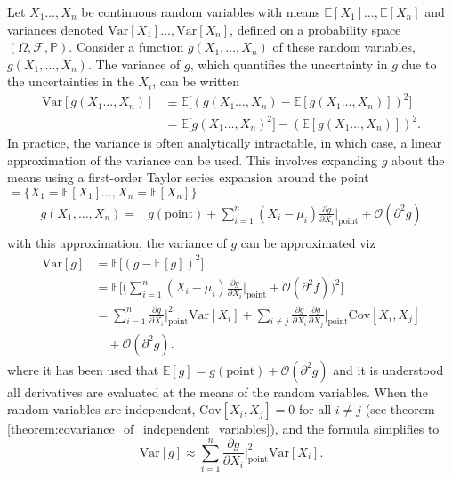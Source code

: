 \begin{definition}
	\label{def:error_propagation}
	Let $X_1 \ldots, X_n$ be continuous random variables with means $\mathbb{E}[X_1] \ldots, \mathbb{E}[X_n]$ and variances denoted $\text{Var}[X_1] \ldots, \text{Var}[X_n]$, defined on a probability space $(\Omega, \mathcal{F},\mathbb{P})$. Consider a function $g(X_1, \ldots, X_n)$ of these random variables, $g(X_1, \ldots, X_n)$. The variance of $g$, which quantifies the uncertainty in $g$ due to the uncertainties in the $X_i$, can be written
	\begin{equation}
		\begin{split}
			\text{Var}[g(X_1 \ldots, X_n)] &\equiv \mathbb{E}\big[(g(X_1 \ldots, X_n) - \mathbb{E}[g(X_1 \ldots, X_n)])^2\big] \\
			&= \mathbb{E}\big[g(X_1\ldots, X_n)^2\big] - (\mathbb{E}[g(X_1 \ldots, X_n)])^2.
		\end{split}
	\end{equation}
	In practice, the variance is often analytically intractable, in which case, a linear approximation of the variance can be used. This involves expanding $g$ about the means using a first-order Taylor series expansion around the point $=\{X_1 = \mathbb{E}[X_1] \ldots, X_n = \mathbb{E}[X_n]\}$
	\begin{equation}
		\begin{split}
			g(X_1, \ldots, X_n) =& g(\text{point}) + \sum_{i=1}^n (X_i - \mu_i) \frac{\partial g}{\partial X_i} \bigg|_{\text{point}} + \mathcal{O}(\partial^2 g) \\
		\end{split}
		\label{e1}
	\end{equation}
	with this approximation, the variance of $g$ can be approximated viz
	\begin{equation}
		\begin{split}
			\text{Var}[g] &= \mathbb{E}\big[(g - \mathbb{E}[g])^2\big] \\
			&= \mathbb{E}\bigg[\bigg( \sum_{i=1}^n (X_i - \mu_i) \frac{\partial g}{\partial X_i}\bigg|_{\text{point}} + \mathcal{O}(\partial^2 f)\bigg)^2\bigg] \\
			&= \sum_{i=1}^n  \frac{\partial g}{\partial X_i}\bigg|_{\text{point}}^2\text{Var}[X_i] + \sum_{i \neq j} \frac{\partial g}{\partial X_i} \frac{\partial g}{\partial X_j}\bigg|_{\text{point}} \text{Cov}[X_i, X_j]\\
			&\quad + \mathcal{O}(\partial^2 g).
		\end{split}
	\end{equation}
	where it has been used that $\mathbb{E}[g]=g(\text{point})+\mathcal{O}(\partial^2g)$ and it is understood all derivatives are evaluated at the means of the random variables. When the random variables are independent, $\text{Cov}[X_i, X_j] = 0$ for all $i \neq j$ (see theorem \ref{theorem:covariance_of_independent_variables}), and the formula simplifies to
	\begin{equation}
		\text{Var}[g] \approx \sum_{i=1}^n  \frac{\partial g}{\partial X_i}\bigg|_{\text{point}}^2\text{Var}[X_i].
	\end{equation}
\end{definition}

